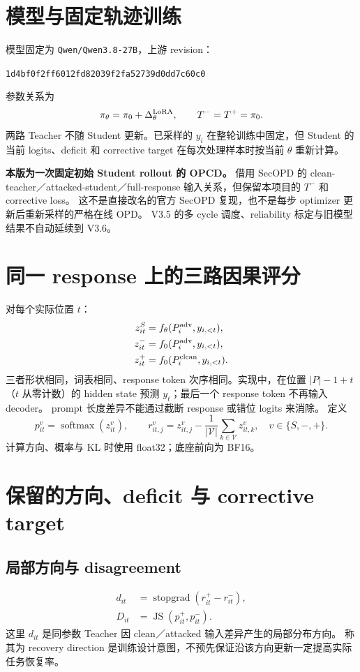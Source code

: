\documentclass[11pt,a4paper]{ctexart}
\newcommand{\sg}{\operatorname{stopgrad}}
\newcommand{\softmax}{\operatorname{softmax}}
\newcommand{\JS}{\operatorname{JS}}
\newcommand{\Vocab}{\mathcal{V}}
\begin{document}
\section{模型与固定轨迹训练}
模型固定为 \texttt{Qwen/Qwen3.8-27B}，上游 revision：
\begin{center}\small\texttt{1d4bf0f2ff6012fd82039f2fa52739d0dd7c60c0}\end{center}
参数关系为
\begin{equation}
  \pi_\theta=\pi_0+\Delta_\theta^{\rm LoRA},\qquad T^-=T^+=\pi_0.
\end{equation}
两路 Teacher 不随 Student 更新。已采样的 $y_i$ 在整轮训练中固定，但 Student 的当前
logits、deficit 和 corrective target 在每次处理样本时按当前 $\theta$ 重新计算。

\textbf{本版为一次固定初始 Student rollout 的 OPCD。} 借用 SecOPD 的
clean-teacher／attacked-student／full-response 输入关系，但保留本项目的 $T^-$ 和 corrective loss。
这不是直接改名的官方 SecOPD 复现，也不是每步 optimizer 更新后重新采样的严格在线 OPD。
V3.5 的多 cycle 调度、reliability 标定与旧模型结果不自动延续到 V3.6。

\section{同一 response 上的三路因果评分}
对每个实际位置 $t$：
\begin{align}
 z^S_{it}&=f_\theta(P_i^{\rm adv},y_{i,<t}),\\
 z^-_{it}&=f_0(P_i^{\rm adv},y_{i,<t}),\\
 z^+_{it}&=f_0(P_i^{\rm clean},y_{i,<t}).
\end{align}
三者形状相同，词表相同、response token 次序相同。实现中，在位置
$|P|-1+t$（$t$ 从零计数）的 hidden state 预测 $y_t$；最后一个 response token 不再输入 decoder。
prompt 长度差异不能通过截断 response 或错位 logits 来消除。
定义
\begin{equation}
 p^v_{it}=\softmax(z^v_{it}),\qquad
 r^v_{it,j}=z^v_{it,j}-\frac1{|\Vocab|}\sum_{k\in\Vocab}z^v_{it,k},
 \quad v\in\{S,-,+\}.
\end{equation}
计算方向、概率与 KL 时使用 float32；底座前向为 BF16。

\section{保留的方向、deficit 与 corrective target}
\subsection{局部方向与 disagreement}
\begin{align}
 d_{it}&=\sg(r^+_{it}-r^-_{it}),\\
 D_{it}&=\JS(p^+_{it},p^-_{it}).
\end{align}
这里 $d_{it}$ 是同参数 Teacher 因 clean／attacked 输入差异产生的局部分布方向。
称其为 recovery direction 是训练设计意图，不预先保证沿该方向更新一定提高实际任务恢复率。
\end{document}
